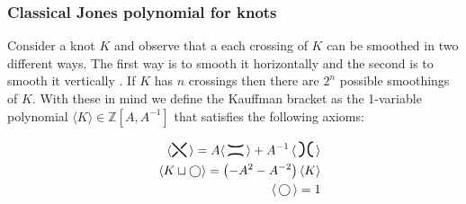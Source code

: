 \subsubsection{\label{sec:theory:jones:classicaljones}Classical Jones polynomial for knots}
Consider  a knot $K$ and observe that a each crossing  of $K$ can be smoothed in two different ways. The first way is to smooth it horizontally  and the second is to smooth it vertically  . If $K$ has $n$ crossings then  there are $2^n$ possible smoothings of $K$. With these in mind we define the Kauffman bracket as the 1-variable polynomial $\langle K \rangle \in \mathbb{Z}[A,A^{-1}]$ that satisfies the following axioms:


\begin{eqnarray}
&&\langle \raisebox{-.1cm}{\begin{tikzpicture}[scale=.2]
\draw [line width=0.35mm]  (-1,-1)-- (-0.22,-0.22);
\draw  [line width=0.35mm ](-1,1)--(0,0);
\draw  [line width=0.35mm] (0.22,0.22) -- (1,1);
\draw [line width=0.35mm]   (0,0) -- +(1,-1);
\end{tikzpicture}}\, \rangle =A \langle \, \raisebox{-.07cm}{\begin{tikzpicture}[scale=.2]
\draw [line width=0.35mm] plot [smooth, tension=2] coordinates { (-1,.8) (0, 0.5) (1,.8)};
\draw [ line width=0.35mm] plot [smooth, tension=2] coordinates { (-1,-.8) (0, -0.5) (1,-.8)};
\end{tikzpicture}}\, \rangle   + A^{-1} \,\langle\, \raisebox{-.1cm}{\begin{tikzpicture}[scale=.2]
 \draw [ line width=0.35mm] plot [smooth, tension=2] coordinates { (-1,-1) (-0.3, 0) (-1,1)};
 \draw [ line width=0.35mm] plot [smooth, tension=2] coordinates { (1,-1) (0.3, 0) (1,1)};
 \end{tikzpicture}}\, \rangle \label{regbracket1} \\
&&\langle K \sqcup \bigcirc \rangle = \left (-A^2 - A^{-2}\right ) \langle K \rangle \\
&&  \langle \, \bigcirc \, \rangle  = 1 
\end{eqnarray}

